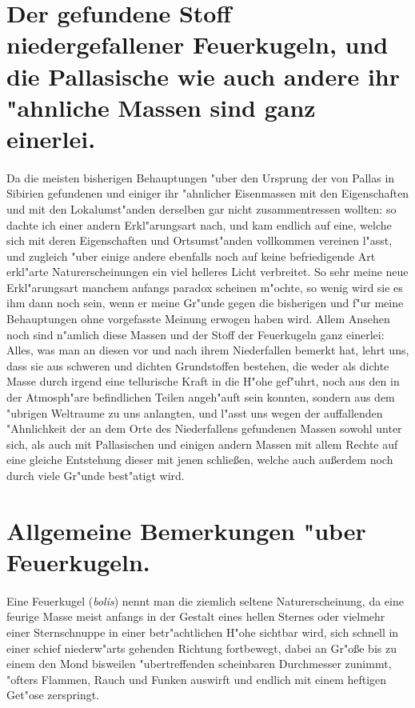 \documentclass[a4paper, 11pt, oneside, polutonikogreek, german]{article}
\begin{document}
\section{Der gefundene Stoff niedergefallener Feuerkugeln, und die Pallasische wie auch andere ihr "ahnliche Massen sind ganz einerlei.}
\paragraph{}
Da die meisten bisherigen Behauptungen "uber den Ursprung der von Pallas in Sibirien gefundenen und einiger ihr "ahnlicher Eisenmassen mit den Eigenschaften und mit den Lokalumst"anden derselben gar nicht zusammentressen wollten: so dachte ich einer andern Erkl"arungsart nach, und kam endlich auf eine, welche sich mit deren Eigenschaften und Ortsumst"anden vollkommen vereinen l"asst, und zugleich "uber einige andere ebenfalls noch auf keine befriedigende Art erkl"arte Naturerscheinungen ein viel helleres Licht verbreitet. So sehr meine neue Erkl"arungsart manchem anfangs paradox scheinen m"ochte, so wenig wird sie es ihm dann noch sein, wenn er meine Gr"unde gegen die bisherigen und f"ur meine Behauptungen ohne vorgefasste Meinung erwogen haben wird. Allem Ansehen noch sind n"amlich diese Massen und der Stoff der Feuerkugeln ganz einerlei: Alles, was man an diesen vor und nach ihrem Niederfallen bemerkt hat, lehrt uns, dass sie aus schweren und dichten Grundstoffen bestehen, die weder als dichte Masse durch irgend eine tellurische Kraft in die H"ohe gef"uhrt, noch aus den in der Atmosph"are befindlichen Teilen angeh"auft sein konnten, sondern aus dem "ubrigen Weltraume zu uns anlangten, und l"asst uns wegen der auffallenden "Ahnlichkeit der an dem Orte des Niederfallens gefundenen Massen sowohl unter sich, als auch mit Pallasischen und einigen andern Massen mit allem Rechte auf eine gleiche Entstehung dieser mit jenen schließen, welche auch außerdem noch durch viele Gr"unde best"atigt wird.
\clearpage
\section{Allgemeine Bemerkungen "uber Feuerkugeln.}
\paragraph{}
Eine Feuerkugel (\emph{bolis}) nennt man die ziemlich seltene Naturerscheinung, da eine feurige Masse meist anfangs in der Gestalt eines hellen Sternes oder vielmehr einer Sternschnuppe in einer betr"achtlichen H"ohe sichtbar wird, sich schnell in einer schief niederw"arts gehenden Richtung fortbewegt, dabei an Gr"oße bis zu einem den Mond bisweilen "ubertreffenden scheinbaren Durchmesser zunimmt, "ofters Flammen, Rauch und Funken auswirft und endlich mit einem heftigen Get"ose zerspringt.
\end{document}
